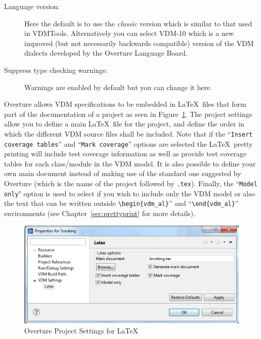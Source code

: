 \documentclass{overturerepchap}
\begin{document}
\begin{description}
\item[Language version:] Here the default is to use the
  \emph{classic} version which is similar to that used in
  VDMTools. Alternatively you can select VDM-10 which
  is a new improved (but not necessarily backwards compatible) version of
  the VDM dialects developed by the Overture Language Board.
\item[Suppress type checking warnings:] Warnings are enabled
  by default but you can change it here.
\end{description}

Overture allows VDM specifications to be embedded in \LaTeX\ files that
form part of the documentation of a project as seen in
Figure~\ref{fig:VDMSettingsLatex}. The project settings allow you
to define a main \LaTeX\ file for the project, and define the order in which the
different VDM source files shall be included. Note that if the
``\texttt{Insert coverage tables}'' and ``\texttt{Mark coverage}''
options are selected the \LaTeX\ pretty printing will include test
coverage information as well as provide test coverage tables for each
class/module in the VDM model. It is also possible to define your own
main document instead of making use of the standard one suggested by
Overture (which is the name of the project followed by \texttt{.tex}). 
Finally, the ``\texttt{Model only}" option is used to select if you 
wish to include only the VDM model or also the text that can be written
outside \verb+\begin{vdm_al}+'' and ``\verb+\end{vdm_al}+'' environments 
(see Chapter~\ref{sec:prettyprint} for more details).

\begin{figure}[!hbt]
\begin{center}
  \includegraphics[width=\textwidth]{screenDumps/projectsettingslatex}
  \caption[Overture Project Settings]{Overture Project Settings for \LaTeX}
  \label{fig:VDMSettingsLatex}
\end{center}
\end{figure}
\end{document}
